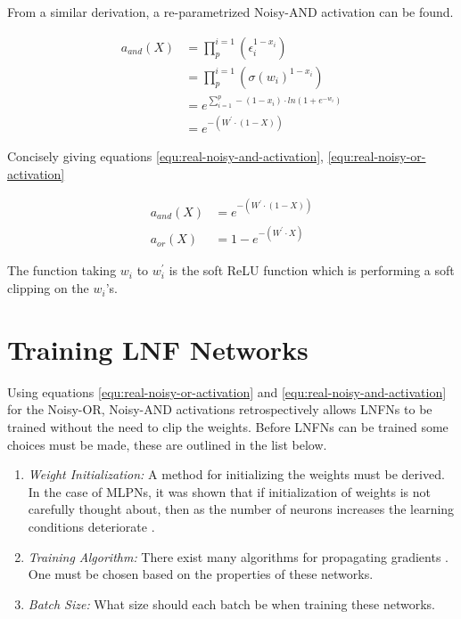 From a similar derivation, a re-parametrized Noisy-AND activation can be found.

\begin{align*}
a_{and}(X) &= \prod_{p}^{i=1} (\epsilon_i^{1 - x_i})\\
&= \prod_{p}^{i=1} (\sigma(w_i)^{1 - x_i})\\
&= e^{\sum^p_{i=1} -(1 - x_i) \cdot ln(1 + e^{-w_i})}\\
&= e^{-(W^{'} \cdot (1 - X))}
\end{align*}

Concisely giving equations \ref{equ:real-noisy-and-activation}, \ref{equ:real-noisy-or-activation}

\begin{align}
a_{and}(X) &= e^{-(W^{'} \cdot (1 - X))} \label{equ:real-noisy-and-activation}\\
a_{or}(X)&= 1 - e^{-(W^{'} \cdot X)} \label{equ:real-noisy-or-activation}
\end{align}

The function taking $w_i$ to $w_i^{'}$ is the soft ReLU function which is performing a soft clipping on the $w_i$'s. 

\section{Training LNF Networks}
Using equations \ref{equ:real-noisy-or-activation} and \ref{equ:real-noisy-and-activation} for the Noisy-OR, Noisy-AND activations retrospectively allows LNFNs to be trained without the need to clip the weights. Before LNFNs can be trained some choices must be made, these are outlined in the list below.

\begin{enumerate}
	\item \textit{Weight Initialization:} A method for initializing the weights must be derived. In the case of MLPNs, it was shown that if initialization of weights is not carefully thought about, then as the number of neurons increases the learning conditions deteriorate \cite{glorot2010understanding}.
	\item \textit{Training Algorithm:} There exist many algorithms for propagating gradients \cite{ruder2016overview}. One must be chosen based on the properties of these networks.
	\item \textit{Batch Size:} What size should each batch be when training these networks.
\end{enumerate}

